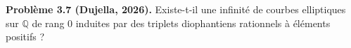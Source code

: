 \textbf{Problème 3.7 (Dujella, 2026).} Existe-t-il une infinité de courbes elliptiques sur $\mathbb{Q}$ de rang 0 induites par des triplets diophantiens rationnels à éléments positifs ?
